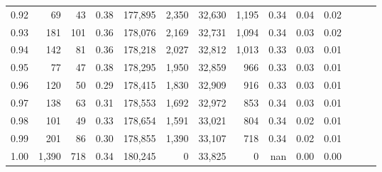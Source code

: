 \begin{tabular}{rrrrrrrrrrrrrr}
0.92 &     69 &   43 &  0.38 &  177,895 &    2,350 &  32,630 &   1,195 &  0.34 &  0.04 &      0.02 \\
0.93 &    181 &  101 &  0.36 &  178,076 &    2,169 &  32,731 &   1,094 &  0.34 &  0.03 &      0.02 \\
0.94 &    142 &   81 &  0.36 &  178,218 &    2,027 &  32,812 &   1,013 &  0.33 &  0.03 &      0.01 \\
0.95 &     77 &   47 &  0.38 &  178,295 &    1,950 &  32,859 &     966 &  0.33 &  0.03 &      0.01 \\
0.96 &    120 &   50 &  0.29 &  178,415 &    1,830 &  32,909 &     916 &  0.33 &  0.03 &      0.01 \\
0.97 &    138 &   63 &  0.31 &  178,553 &    1,692 &  32,972 &     853 &  0.34 &  0.03 &      0.01 \\
0.98 &    101 &   49 &  0.33 &  178,654 &    1,591 &  33,021 &     804 &  0.34 &  0.02 &      0.01 \\
0.99 &    201 &   86 &  0.30 &  178,855 &    1,390 &  33,107 &     718 &  0.34 &  0.02 &      0.01 \\
1.00 &  1,390 &  718 &  0.34 &  180,245 &        0 &  33,825 &       0 &   nan &  0.00 &      0.00 \\
\bottomrule
\end{tabular}
